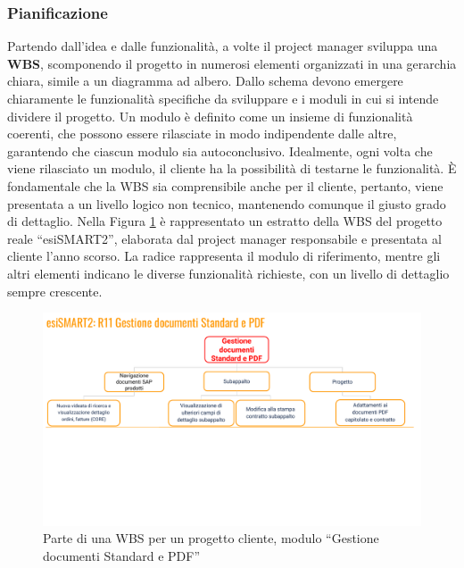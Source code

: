         \subsubsection{Pianificazione}
        Partendo dall’idea e dalle funzionalità, a volte il project manager sviluppa una \textbf{\ac{WBS}}, scomponendo il progetto in
        numerosi elementi organizzati in una gerarchia chiara, simile a un diagramma ad albero. Dallo schema devono emergere chiaramente le
        funzionalità specifiche da sviluppare e i moduli in cui si intende dividere il progetto. Un modulo è definito come un insieme di funzionalità
        coerenti, che possono essere rilasciate in modo indipendente dalle altre, garantendo che ciascun modulo sia autoconclusivo. Idealmente, ogni
        volta che viene rilasciato un modulo, il cliente ha la possibilità di testarne le funzionalità. È fondamentale che la \ac{WBS} sia comprensibile
        anche per il cliente, pertanto, viene presentata a un livello logico non tecnico, mantenendo comunque il giusto grado di dettaglio.
        Nella Figura \ref{fig:wbs-esismart} è rappresentato un estratto della \ac{WBS} del progetto reale “esiSMART2”, elaborata dal project manager responsabile e
        presentata al cliente l'anno scorso. La radice rappresenta il modulo di riferimento, mentre gli altri elementi indicano le diverse
        funzionalità richieste, con un livello di dettaglio sempre crescente.

        \begin{figure}
            \centering
            \includegraphics[width=\linewidth]{figures/esismartWBS.pdf}
            \caption{Parte di una WBS per un progetto cliente, modulo “Gestione documenti Standard e PDF”}
            \label{fig:wbs-esismart}
        \end{figure}

